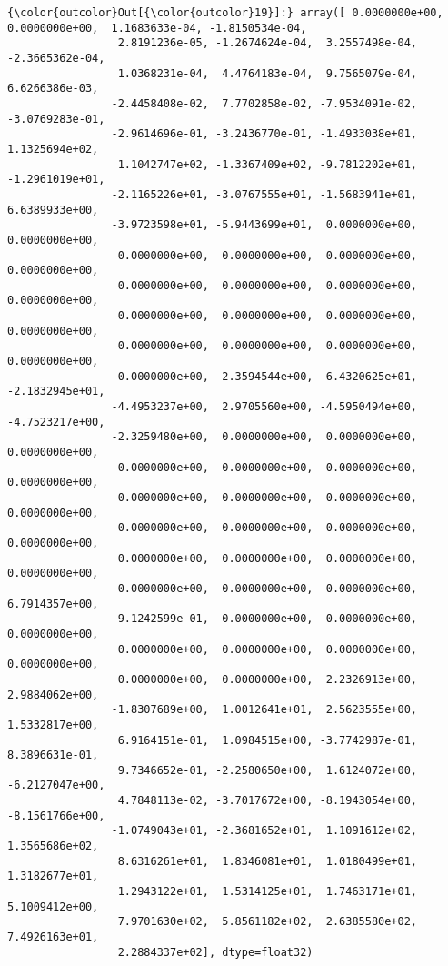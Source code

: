 \documentclass[11pt]{article}
\begin{document}
\begin{Verbatim}[commandchars=\\\{\}]
{\color{outcolor}Out[{\color{outcolor}19}]:} array([ 0.0000000e+00,  0.0000000e+00,  1.1683633e-04, -1.8150534e-04,
                 2.8191236e-05, -1.2674624e-04,  3.2557498e-04, -2.3665362e-04,
                 1.0368231e-04,  4.4764183e-04,  9.7565079e-04,  6.6266386e-03,
                -2.4458408e-02,  7.7702858e-02, -7.9534091e-02, -3.0769283e-01,
                -2.9614696e-01, -3.2436770e-01, -1.4933038e+01,  1.1325694e+02,
                 1.1042747e+02, -1.3367409e+02, -9.7812202e+01, -1.2961019e+01,
                -2.1165226e+01, -3.0767555e+01, -1.5683941e+01,  6.6389933e+00,
                -3.9723598e+01, -5.9443699e+01,  0.0000000e+00,  0.0000000e+00,
                 0.0000000e+00,  0.0000000e+00,  0.0000000e+00,  0.0000000e+00,
                 0.0000000e+00,  0.0000000e+00,  0.0000000e+00,  0.0000000e+00,
                 0.0000000e+00,  0.0000000e+00,  0.0000000e+00,  0.0000000e+00,
                 0.0000000e+00,  0.0000000e+00,  0.0000000e+00,  0.0000000e+00,
                 0.0000000e+00,  2.3594544e+00,  6.4320625e+01, -2.1832945e+01,
                -4.4953237e+00,  2.9705560e+00, -4.5950494e+00, -4.7523217e+00,
                -2.3259480e+00,  0.0000000e+00,  0.0000000e+00,  0.0000000e+00,
                 0.0000000e+00,  0.0000000e+00,  0.0000000e+00,  0.0000000e+00,
                 0.0000000e+00,  0.0000000e+00,  0.0000000e+00,  0.0000000e+00,
                 0.0000000e+00,  0.0000000e+00,  0.0000000e+00,  0.0000000e+00,
                 0.0000000e+00,  0.0000000e+00,  0.0000000e+00,  0.0000000e+00,
                 0.0000000e+00,  0.0000000e+00,  0.0000000e+00,  6.7914357e+00,
                -9.1242599e-01,  0.0000000e+00,  0.0000000e+00,  0.0000000e+00,
                 0.0000000e+00,  0.0000000e+00,  0.0000000e+00,  0.0000000e+00,
                 0.0000000e+00,  0.0000000e+00,  2.2326913e+00,  2.9884062e+00,
                -1.8307689e+00,  1.0012641e+01,  2.5623555e+00,  1.5332817e+00,
                 6.9164151e-01,  1.0984515e+00, -3.7742987e-01,  8.3896631e-01,
                 9.7346652e-01, -2.2580650e+00,  1.6124072e+00, -6.2127047e+00,
                 4.7848113e-02, -3.7017672e+00, -8.1943054e+00, -8.1561766e+00,
                -1.0749043e+01, -2.3681652e+01,  1.1091612e+02,  1.3565686e+02,
                 8.6316261e+01,  1.8346081e+01,  1.0180499e+01,  1.3182677e+01,
                 1.2943122e+01,  1.5314125e+01,  1.7463171e+01,  5.1009412e+00,
                 7.9701630e+02,  5.8561182e+02,  2.6385580e+02,  7.4926163e+01,
                 2.2884337e+02], dtype=float32)
\end{Verbatim}
            
\end{document}
